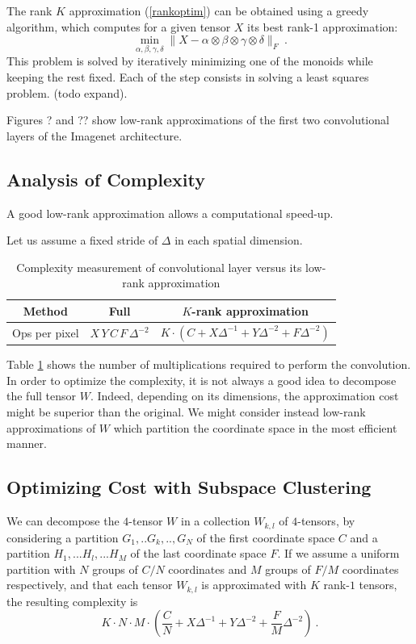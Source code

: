 \documentclass{article}
\begin{document}
The rank $K$ approximation (\ref{rankoptim}) can be obtained using a greedy 
algorithm, which computes for a given tensor $X$ its best rank-1 approximation:
\begin{equation}
\label{pla}
\min_{\alpha, \beta, \gamma, \delta} \| X - \alpha \otimes \beta \otimes \gamma \otimes \delta \|_F ~.
\end{equation}
This problem is solved by iteratively minimizing one of the monoids while keeping 
the rest fixed. Each of the step consists in solving a least squares problem. (todo expand).

Figures ? and ?? show low-rank approximations of the first two convolutional
layers of the Imagenet architecture.


\subsection{Analysis of Complexity}

A good low-rank approximation allows a computational speed-up. 

Let us assume a fixed stride of $\Delta$ in each spatial dimension. 

\begin{table}
\label{firsttable}
\caption{Complexity measurement 
of convolutional layer versus its low-rank approximation}
\centering
\begin{tabular}{|c| c c |}
\hline
Method & Full & $K$-rank approximation \\
\hline
Ops per pixel & $X\,Y\,C\,F\, \Delta^{-2}$ & $K \cdot ( C + X \Delta^{-1} + Y \Delta^{-2} + F \Delta^{-2})$ \\
\hline
\end{tabular}
\end{table}

Table \ref{firsttable} shows the number of multiplications required to perform the 
convolution. In order to optimize the complexity, it is not always a good idea 
to decompose the full tensor $W$. Indeed, depending on its dimensions, 
the approximation cost might be superior than the original.
We might consider instead low-rank approximations of $W$ 
which partition the coordinate space in the most efficient manner.

\subsection{Optimizing Cost with Subspace Clustering}

We can decompose the $4$-tensor $W$ in a collection $W_{k,l}$ of $4$-tensors, 
by considering a partition $G_1,..G_k,..,G_N$ of the first coordinate space $C$ and
a partition $H_1,...H_l,...H_M$ of the last coordinate space $F$. 
 If we assume a uniform partition with $N$ groups of $C/N$ coordinates and 
 $M$ groups of $F/M$ coordinates respectively, and that each tensor $W_{k,l}$ 
 is approximated with $K$ rank-$1$ tensors, the resulting complexity is 
 $$K \cdot N \cdot M \cdot \left( \frac{C}{N} + X \Delta^{-1} + Y \Delta^{-2} + \frac{F}{M} \Delta^{-2}\right)~.$$
 
\end{document}

